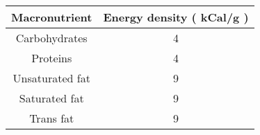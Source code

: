\begin{table}[H]
\centering
\begin{tabular}{|c|c|}
\hline
\textbf{Macronutrient} & \textbf{Energy density ( kCal/g )} \\
\hline
Carbohydrates & 4 \\
\hline
Proteins & 4 \\
\hline
Unsaturated fat & 9 \\
\hline
Saturated fat & 9 \\
\hline
Trans fat & 9 \\
\hline
\end{tabular}
\end{table}
